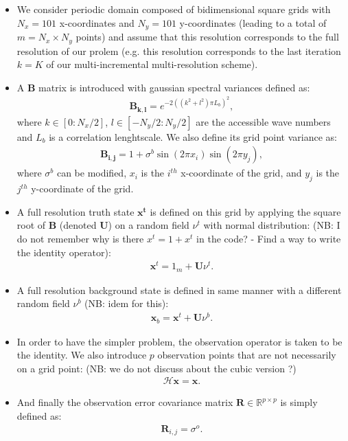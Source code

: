 \documentclass[npg, manuscript]{copernicus}
\begin{document}
\begin{itemize}
 \item We consider periodic domain composed of bidimensional square grids with $N_x=101$ x-coordinates and $N_y=101$ y-coordinates (leading to a total of $m = N_x \times N_y$ points) and assume that this resolution corresponds to the full resolution of our prolem (e.g. this resolution corresponds to the last iteration $k=K$ of our multi-incremental multi-resolution scheme).
 \item A $\mathbf{B}$ matrix is introduced with gaussian spectral variances defined as:
 \begin{align}
  \mathbf{B_{k,l}} = e^{-2((k^2 + l^2)\pi L_b)^2}, 
 \end{align}
 where $k \in [0:N_x/2]$, $l \in [-N_y/2:N_y/2]$ are the accessible wave numbers and $L_b$ is a correlation lenghtscale.
 We also define its grid point variance as:
 \begin{align}
 \mathbf{B_{i,j}} = 1 + \sigma^b \sin(2\pi x_i) \sin(2\pi y_j),  
 \end{align}
where $\sigma^b$ can be modified, $x_i$ is the $i^{th}$ x-coordinate of the grid, and $y_j$ is the $j^{th}$ y-coordinate of the grid.
 \item A full resolution truth state $\mathbf{x^t}$ is defined on this grid by applying the square root of $\mathbf{B}$ (denoted $\mathbf{U}$) on a random field $\nu^{t}$ with normal distribution: (NB: I do not remember why is there $x^t = 1+x^t$ in the code? - Find a way to write the identity operator):
 \begin{align}
 \mathbf{x}^t = 1_m + \mathbf{U}\nu^{t}.
 \end{align}
 \item A full resolution background state is defined in same manner with a different random field $\nu^{b}$ (NB: idem for this):
 \begin{align}
 \mathbf{x}_b=\mathbf{x}^t + \mathbf{U}\nu^{b}.
 \end{align}
 \item In order to have the simpler problem, the observation operator is taken to be the identity. We also introduce $p$ observation points that are not necessarily on a grid point: (NB: we do not discuss about the cubic version ?)
 \begin{align}
  \mathcal{H}\mathbf{x} = \mathbf{x}. 
 \end{align}
 \item And finally the observation error covariance matrix $\mathbf{R} \in \mathbb{R}^{p \times p}$ is simply defined as:
 \begin{align}
 \mathbf{R}_{i,j} = \sigma^o.
 \end{align}
\end{itemize}
\end{document}
